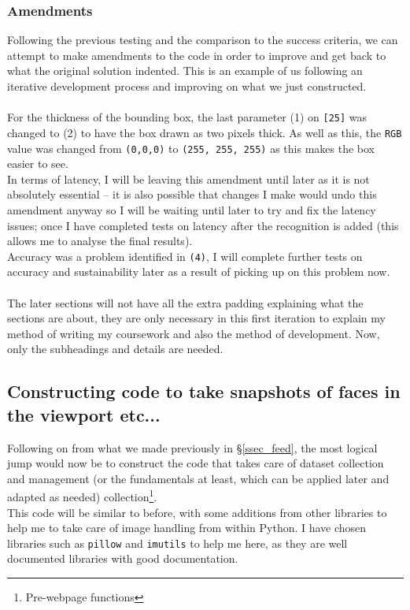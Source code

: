 \documentclass[9pt]{article}
\begin{document}
\subsubsection{Amendments}
Following the previous testing and the comparison to the success criteria, we can attempt to make amendments to the code in order to improve and get back to what the original solution indented. This is an example of us following an iterative development process and improving on what we just constructed. \\\\
For the thickness of the bounding box, the last parameter (1) on \texttt{[25]} was changed to (2) to  have the box drawn as two pixels thick. As well as this, the \texttt{RGB} value was changed from \texttt{(0,0,0)} to \texttt{(255, 255, 255)} as this makes the box easier to see.\\
In terms of latency, I will be leaving this amendment until later as it is not absolutely essential -- it is also possible that changes I make would undo this amendment anyway so I will be waiting until later to try and fix the latency issues; once I have completed tests on latency after the recognition is added (this allows me to analyse the final results). \\
Accuracy was a problem identified in \texttt{(4)}, I will complete further tests on accuracy and sustainability later as a result of picking up on this problem now. \\\\
The later sections will not have all the extra padding explaining what the sections are about, they are only necessary in this first iteration to explain my method of writing my coursework and also the method of development. Now, only the subheadings and details are needed.
















\newpage
\subsection{Constructing code to take snapshots of faces in the viewport etc...}
Following on from what we made previously in \S\ref{ssec_feed}, the most logical jump would now be to construct the code that takes care of dataset collection and management (or the fundamentals at least, which can be applied later and adapted as needed) collection\footnote{Pre-webpage functions}. \\
This code will be similar to before, with some additions from other libraries to help me to take care of image handling from within Python. I have chosen libraries such as \texttt{pillow}\cite{} and \texttt{imutils}\cite{} to help me here, as they are well documented libraries with good documentation.
\end{document}
